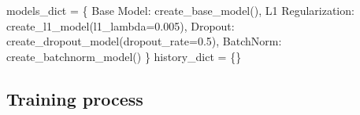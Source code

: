\documentclass[
]{IEEEtran}
\newenvironment{Shaded}{\begin{snugshade}}{\end{snugshade}}
\newcommand{\FloatTok}[1]{\textcolor[rgb]{0.68,0.00,0.00}{#1}}
\newcommand{\NormalTok}[1]{\textcolor[rgb]{0.00,0.23,0.31}{#1}}
\newcommand{\OperatorTok}[1]{\textcolor[rgb]{0.37,0.37,0.37}{#1}}
\newcommand{\StringTok}[1]{\textcolor[rgb]{0.13,0.47,0.30}{#1}}
\begin{document}
\begin{Shaded}
\begin{Highlighting}[]
\NormalTok{models\_dict }\OperatorTok{=}\NormalTok{ \{}
    \StringTok{\textquotesingle{}Base Model\textquotesingle{}}\NormalTok{:        create\_base\_model(),}
    \StringTok{\textquotesingle{}L1 Regularization\textquotesingle{}}\NormalTok{: create\_l1\_model(l1\_lambda}\OperatorTok{=}\FloatTok{0.005}\NormalTok{),}
    \StringTok{\textquotesingle{}Dropout\textquotesingle{}}\NormalTok{:           create\_dropout\_model(dropout\_rate}\OperatorTok{=}\FloatTok{0.5}\NormalTok{),}
    \StringTok{\textquotesingle{}BatchNorm\textquotesingle{}}\NormalTok{:         create\_batchnorm\_model()}
\NormalTok{\}}
\NormalTok{history\_dict }\OperatorTok{=}\NormalTok{ \{\}}
\end{Highlighting}
\end{Shaded}

\subsection{Training process}\label{training-process}
\end{document}
